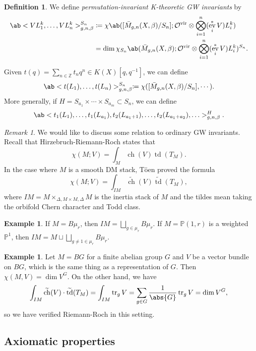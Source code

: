\documentclass{amsart}
\theoremstyle{definition}
\newtheorem{defn}[thm]{Definition}
\newtheorem{exm}[thm]{Example}
\theoremstyle{remark}
\newtheorem{rmk}[thm]{Remark}
\theoremstyle{plain}
\theoremstyle{definition}
\theoremstyle{remark}
\newcommand{\Z}{\mathbb{Z}}
\renewcommand{\P}{\mathbb{P}}
\newcommand{\mc}[1]{\mathcal{#1}}
\newcommand{\mr}[1]{\mathrm{#1}}
\newcommand{\on}[1]{\operatorname{#1}}
\newcommand{\wt}[1]{\widetilde{#1}}
\newcommand{\1}{\mathbf{1}}
\newcommand{\2}{\mathbf{2}}
\newcommand{\3}{\mathbf{3}}
\newcommand{\vir}{\mr{vir}}
\DeclareMathOperator{\ev}{ev}
\begin{document}
\begin{defn}
    We define \textit{permutation-invariant K-theoretic GW invariants} by
    \begin{align*}
        \ab<V L_1^k, \ldots, V L_n^k>_{g,n,\beta}^{S_n} &\coloneqq \chi\ab([ \bar{M}_{g,n}(X, \beta)/S_n ]; \mc{O}^{\vir} \otimes \bigotimes_{i=1}^n ( \ev_i^* V ) L_i^k) \\
        &= \dim \chi_{S_n} \ab(\bar{M}_{g,n}(X, \beta); \mc{O}^{\vir} \otimes \bigotimes_{i=1}^n ( \ev_i^* V ) L_i^k )^{S_n}.
    \end{align*}
\end{defn}

Given \(t(q) = \sum_{n \in \Z} t_n q^n \in K(X)[q,q^{-1}]\), we can define
\[ \ab< t(L_1), \ldots, t(L_n)>^{S_n}_{g,n,\beta} \coloneqq \chi ([\bar{M}_{g,n}(X,\beta)/S_n], \cdots). \]
More generally, if \(H = S_{a_1} \times \cdots \times S_{a_m} \subset S_n\), we can define
\[ \ab<t_1(L_1), \ldots, t_1(L_{a_1}), t_2(L_{a_1+1}), \ldots, t_2(L_{a_1+a_2}), \ldots>_{g,n,\beta}^H. \]

\begin{rmk}
    We would like to discuss some relation to ordinary GW invariants. Recall that Hirzebruch-Riemann-Roch states that 
    \[ \chi(M; V) = \int_M \on{ch}(V) \on{td}(T_M). \]
    In the case where \(M\) is a smooth DM stack, T\"oen proved the formula
    \[ \chi(M; V) = \int_{IM} \wt{\on{ch}}(V) \wt{\on{td}}(T_M), \]
    where \(IM = M \times_{\Delta, M \times M, \Delta} M\) is the inertia stack of \(M\) and the tildes mean taking the orbifold Chern character and Todd class. 
\end{rmk}

\begin{exm}
    If \(M = B\mu_r\), then \(IM = \bigsqcup_{g \in \mu_r} B \mu_r\). If \(M = \P(1, r)\) is a weighted \(\P^1\), then \(IM = M \sqcup \bigsqcup_{g \neq 1 \in \mu_r} B\mu_r\).    
\end{exm}

\begin{exm}
    Let \(M = BG\) for a finite abelian group \(G\) and \(V\) be a vector bundle on \(BG\), which is the same thing as a representation of \(G\). Then \(\chi(M, V) = \dim V^G\). On the other hand, we have
    \[ \int_{IM} \wt{\on{ch}}(V) \cdot \wt{\on{td}}(T_M) = \int_{IM} \on{tr}_g V = \sum_{g \in G} \frac{1}{\abs{G}} \on{tr}_g V = \dim V^G, \]
    so we have verified Riemann-Roch in this setting.
\end{exm}

\subsection{Axiomatic properties}%
\label{sub:Axiomatic properties}
\end{document}
